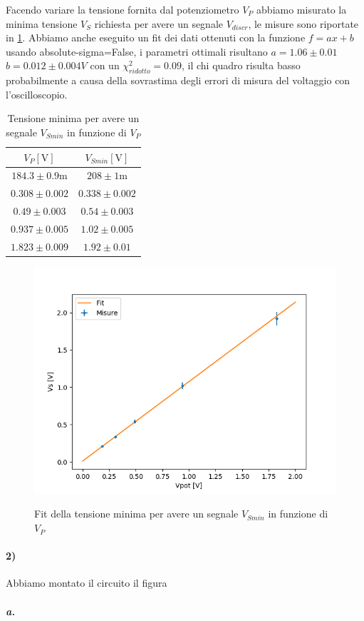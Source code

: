 \documentclass{article}
\begin{document}
	Facendo variare la tensione fornita dal potenziometro $V_P$ abbiamo misurato la minima tensione $V_S$ richiesta per avere un segnale $V_{discr}$, le misure sono riportate in \ref{tab 1c2}. Abbiamo anche eseguito un fit dei dati ottenuti con la funzione $f=ax+b$ usando absolute-sigma=False, i parametri ottimali risultano $a=1.06\pm0.01$ $b=0.012\pm0.004 V$ con un $\chi^2_{ridotto}=0.09$, il chi quadro risulta basso probabilmente a causa della sovrastima degli errori di misura del voltaggio con l'oscilloscopio.
	\begin{table}
		\begin{center}
			\begin{tabular}{cc}
				\hline
				$V_P [\mathrm{V}]$&$V_{Smin} [\mathrm{V}]$ \\
				\hline
				$184.3\pm0.9 \mathrm{m}$ & $208\pm1\mathrm{m}$ \\
				$0.308\pm0.002$ & $0.338\pm0.002$ \\
				$0.49\pm0.003$ & $0.54\pm0.003$ \\
				$0.937\pm0.005$ & $1.02\pm0.005$ \\
				$1.823\pm0.009$ & $1.92\pm0.01$ \\
			\end{tabular}
		\end{center}
		\label{tab 1c2}
		\caption{Tensione minima per avere un segnale $V_{Smin}$ in funzione di $V_{P}$}	
	\end{table}
	
	\begin{figure}
		\centering
		\includegraphics[width=\linewidth]{immagini/1c-2.png}
		\label{fit:1c-2}
		\caption{Fit della tensione minima per avere un segnale $V_{Smin}$ in funzione di $V_{P}$}
	\end{figure}

\paragraph{2)}
	Abbiamo montato il circuito il figura 
	\subparagraph{a.}
\end{document}
